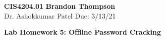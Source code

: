 \noindent
\textbf{CIS4204.01} \hfill \textbf{Brandon Thompson} \\
\normalsize Dr. Ashokkumar Patel \hfill Due: 3/13/21\\

\begin{center}
\textbf{Lab Homework 5: Offline Password Cracking}
\end{center}